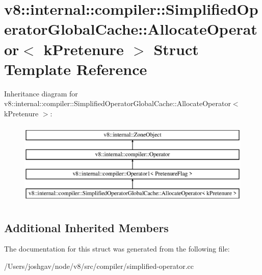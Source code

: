 \hypertarget{structv8_1_1internal_1_1compiler_1_1_simplified_operator_global_cache_1_1_allocate_operator}{}\section{v8\+:\+:internal\+:\+:compiler\+:\+:Simplified\+Operator\+Global\+Cache\+:\+:Allocate\+Operator$<$ k\+Pretenure $>$ Struct Template Reference}
\label{structv8_1_1internal_1_1compiler_1_1_simplified_operator_global_cache_1_1_allocate_operator}
Inheritance diagram for v8\+:\+:internal\+:\+:compiler\+:\+:Simplified\+Operator\+Global\+Cache\+:\+:Allocate\+Operator$<$ k\+Pretenure $>$\+:\begin{figure}[H]
\begin{center}
\leavevmode
\includegraphics[height=4.000000cm]{structv8_1_1internal_1_1compiler_1_1_simplified_operator_global_cache_1_1_allocate_operator}
\end{center}
\end{figure}
\subsection*{Additional Inherited Members}


The documentation for this struct was generated from the following file\+:\begin{DoxyCompactItemize}
\item 
/\+Users/joshgav/node/v8/src/compiler/simplified-\/operator.\+cc\end{DoxyCompactItemize}
